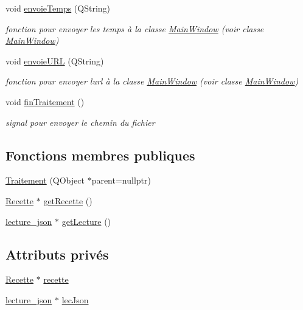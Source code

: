 \begin{DoxyCompactItemize}
void \hyperlink{classTraitement_ae57543af34e05b74a7af460c0e74e87f}{envoie\+Temps} (Q\+String)
\begin{DoxyCompactList}\small\item\em fonction pour envoyer les temps à la classe \hyperlink{classMainWindow}{Main\+Window} (voir classe \hyperlink{classMainWindow}{Main\+Window}) \end{DoxyCompactList}\item 
void \hyperlink{classTraitement_acc099bf1113669c2e061e8897c3eaeca}{envoie\+U\+RL} (Q\+String)
\begin{DoxyCompactList}\small\item\em fonction pour envoyer l\textquotesingle{}url à la classe \hyperlink{classMainWindow}{Main\+Window} (voir classe \hyperlink{classMainWindow}{Main\+Window}) \end{DoxyCompactList}\item 
void \hyperlink{classTraitement_a83495c6e878e66511b8af67ee369a012}{fin\+Traitement} ()
\begin{DoxyCompactList}\small\item\em signal pour envoyer le chemin du fichier \end{DoxyCompactList}\end{DoxyCompactItemize}
\subsection*{Fonctions membres publiques}
\begin{DoxyCompactItemize}
\item 
\hyperlink{classTraitement_a36edd9e6ce6e72cfef7f9c857c3c9cf2}{Traitement} (Q\+Object $\ast$parent=nullptr)
\item 
\hyperlink{classRecette}{Recette} $\ast$ \hyperlink{classTraitement_aba3c99b92a3b6d429e4479294267af9d}{get\+Recette} ()
\item 
\hyperlink{classlecture__json}{lecture\+\_\+json} $\ast$ \hyperlink{classTraitement_a4392841087f03b430af24fa5233d6864}{get\+Lecture} ()
\end{DoxyCompactItemize}
\subsection*{Attributs privés}
\begin{DoxyCompactItemize}
\item 
\hyperlink{classRecette}{Recette} $\ast$ \hyperlink{classTraitement_afc8ac78bded6d17a86323544aa00d91b}{recette}
\item 
\hyperlink{classlecture__json}{lecture\+\_\+json} $\ast$ \hyperlink{classTraitement_ac7e6ff3bfc54975b1c8831a2ad8fc9a4}{lec\+Json}
\end{DoxyCompactItemize}


